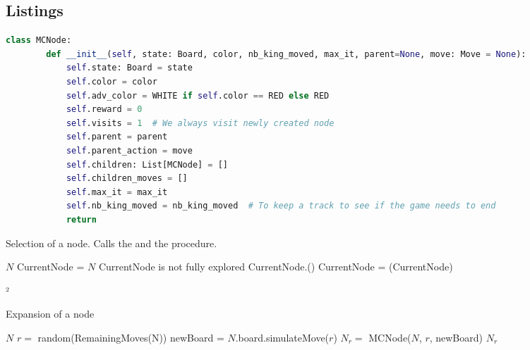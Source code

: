 \documentclass[11pt,a4paper]{article}
\begin{document}
\begin{appendices}
\section{Listings}
\begin{lstlisting}[language=python, label=listing:constructor, caption={Constructor of a Monte-Carlo Tree-Search Node}]
    class MCNode:
        def __init__(self, state: Board, color, nb_king_moved, max_it, parent=None, move: Move = None):
            self.state: Board = state
            self.color = color
            self.adv_color = WHITE if self.color == RED else RED
            self.reward = 0
            self.visits = 1  # We always visit newly created node
            self.parent = parent
            self.parent_action = move
            self.children: List[MCNode] = []
            self.children_moves = []
            self.max_it = max_it
            self.nb_king_moved = nb_king_moved  # To keep a track to see if the game needs to end
            return
    \end{lstlisting}

    
    \begin{algorithm}
    \caption{Selection of a node. Calls the  and the  procedure.}\label{listing:selection}
    \begin{algorithmic}
        \State $N$
        \State CurrentNode = $N$ 
        \If 
        {CurrentNode is not fully explored} 
        \State \Return CurrentNode.()
        \Else 
        \State CurrentNode = (CurrentNode)
        \EndIf
        \EndWhile
        \EndProcedure
    \end{algorithmic}
\end{algorithm}
²
\begin{algorithm}
    \caption{Expansion of a node}\label{listing:expand}
    \begin{algorithmic}
    \State $N$
    \State $r = $ random(RemainingMoves(N))
    \State newBoard = $N$.board.simulateMove($r$)
    \State $N_r = $ MCNode($N$, $r$, newBoard)
    \State \Return $N_r$
    \EndProcedure
    \end{algorithmic}
\end{algorithm}
\end{appendices}
\end{document}
